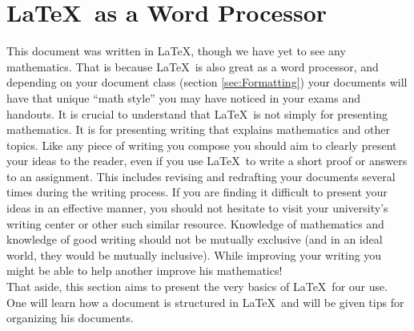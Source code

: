 \documentclass[10pt]{article}
\theoremstyle{Theorem}
\theoremstyle{definition}
\theoremstyle{custom}
\begin{document}
\section{\LaTeX\ as a Word Processor}
	This document was written in \LaTeX, though we have yet to see any mathematics. That is because \LaTeX\ is also great as a word processor, and depending on your document class (section \ref{sec:Formatting}) your documents will have that unique ``math style'' you may have noticed in your exams and handouts. It is crucial to understand that \LaTeX\ is not simply for presenting mathematics. It is for presenting writing that explains mathematics and other topics. Like any piece of writing you compose you should aim to clearly present your ideas to the reader, even if you use \LaTeX\ to write a short proof or answers to an assignment. This includes revising and redrafting your documents several times during the writing process. If you are finding it difficult to present your ideas in an effective manner, you should not hesitate to visit your university's writing center or other such similar resource. Knowledge of mathematics and knowledge of good writing should not be mutually exclusive (and in an ideal world, they would be mutually inclusive). While improving your writing you might be able to help another improve his mathematics!\\
	\indent That aside, this section aims to present the very basics of \LaTeX\ for our use. One will learn how a document is structured in \LaTeX\ and will be given tips for organizing his documents.

\end{document}
